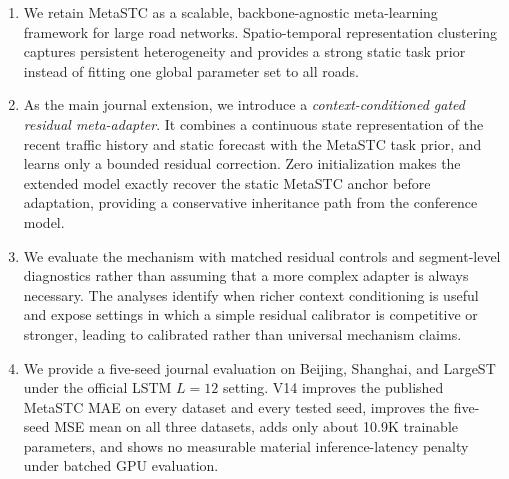 \documentclass[lettersize,journal]{IEEEtran}
\begin{document}
\begin{enumerate}
\item We retain MetaSTC as a scalable, backbone-agnostic meta-learning framework for large road networks. Spatio-temporal representation clustering captures persistent heterogeneity and provides a strong static task prior instead of fitting one global parameter set to all roads.
\item As the main journal extension, we introduce a \emph{context-conditioned gated residual meta-adapter}. It combines a continuous state representation of the recent traffic history and static forecast with the MetaSTC task prior, and learns only a bounded residual correction. Zero initialization makes the extended model exactly recover the static MetaSTC anchor before adaptation, providing a conservative inheritance path from the conference model.
\item We evaluate the mechanism with matched residual controls and segment-level diagnostics rather than assuming that a more complex adapter is always necessary. The analyses identify when richer context conditioning is useful and expose settings in which a simple residual calibrator is competitive or stronger, leading to calibrated rather than universal mechanism claims.
\item We provide a five-seed journal evaluation on Beijing, Shanghai, and LargeST under the official LSTM $L=12$ setting. V14 improves the published MetaSTC MAE on every dataset and every tested seed, improves the five-seed MSE mean on all three datasets, adds only about 10.9K trainable parameters, and shows no measurable material inference-latency penalty under batched GPU evaluation.
\end{enumerate} 
\end{document}
